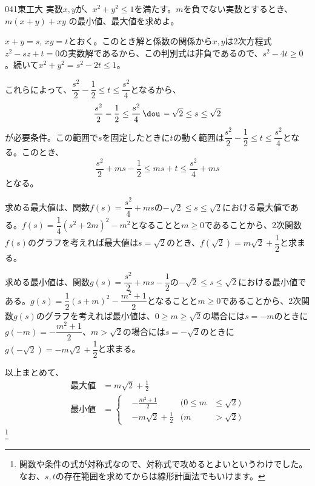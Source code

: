 \begin{prob}{041}{}{東工大}
 実数$x,y$が、$x^2+y^2\le 1$を満たす。$m$を負でない実数とするとき、$m(x+y)+xy$ の最小値、最大値を求めよ。
\end{prob}
$x+y=s$, $xy=t$とおく。このとき解と係数の関係から$x, y$は2次方程式$z^2-sz+t=0$の実数解であるから、この判別式は非負であるので、$s^2-4t\ge 0$。続いて$x^2+y^2=s^2-2t\le 1$。

これらによって、$\dfrac{s^2}{2}-\dfrac{1}{2}\le t\le \dfrac{s^2}{4}$となるから、
\[ \frac{s^2}{2}-\frac{1}{2}\le \frac{s^2}{4} \,\dou\, -\sqrt{2}\le s\le \sqrt{2} \]
が必要条件。この範囲で$s$を固定したときに$t$の動く範囲は$\dfrac{s^2}{2}-\dfrac{1}{2}\le t\le \dfrac{s^2}{4}$となる。このとき、
\[ \frac{s^2}{2}+ms-\frac{1}{2}\le ms+t\le \frac{s^2}{4}+ms \]
となる。

求める最大値は、関数$f(s)=\dfrac{s^2}{4}+ms$の$-\sqrt{2}\le s\le\sqrt{2}$における最大値である。$f(s)=\dfrac{1}{4}(s^2+2m)^2-m^2$となることと$m\ge 0$であることから、2次関数$f(s)$のグラフを考えれば最大値は$s=\sqrt{2}$のとき、$f(\sqrt{2})=m\sqrt{2}+\dfrac{1}{2}$と求まる。

求める最小値は、関数$g(s)=\dfrac{s^2}{2}+ms-\dfrac{1}{2}$の$-\sqrt{2}\le s\le \sqrt{2}$における最小値である。$g(s)=\dfrac{1}{2}(s+m)^2-\dfrac{m^2+1}{2}$となることと$m\ge 0$であることから、2次関数$g(s)$のグラフを考えれば最小値は、$0\ge m\ge\sqrt{2}$の場合には$s=-m$のときに$g(-m)=-\dfrac{m^2+1}{2}$、$m>\sqrt{2}$の場合には$s=-\sqrt{2}$のときに$g(-\sqrt{2})=-m\sqrt{2}+\dfrac{1}{2}$と求まる。

以上まとめて、
\begin{align*}
 \text{最大値}&=m\sqrt{2}+\frac{1}{2} \\
 \text{最小値}&=\left\{
 \begin{aligned}
  &-\frac{m^2+1}{2}  & (0\le m&\le\sqrt{2}) \\
  &-m\sqrt{2}+\frac{1}{2} & (m&>\sqrt{2})
 \end{aligned} \right.
\end{align*}
\footnote{関数や条件の式が対称式なので、対称式で攻めるとよいというわけでした。なお、$s, t$の存在範囲を求めてからは線形計画法でもいけます。}